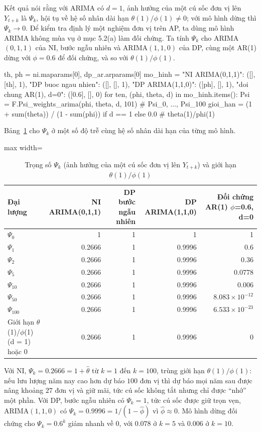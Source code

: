 Kết quả  nói rằng với ARIMA có $d=1$, ảnh hưởng của một cú sốc đơn vị lên $Y_{t+k}$ là $\Psi_k$, hội tụ về hệ số nhân dài hạn $\theta(1)/\phi(1)\ne0$; với mô hình dừng thì $\Psi_k\to0$.
 Để kiểm tra định lý một nghiệm đơn vị trên AP, ta dùng mô hình ARIMA không mùa vụ ở mục 5.2(a) làm đối chứng. Ta tính $\Psi_k$ cho ARIMA$(0,1,1)$ của NI, bước ngẫu nhiên và ARIMA$(1,1,0)$ của DP, cùng một AR(1) dừng với $\phi=0.6$ để đối chứng, và so với $\theta(1)/\phi(1)$.
\begin{codeblock}
th, ph = ni.maparams[0], dp_ar.arparams[0]
mo_hinh = {"NI ARIMA(0,1,1)": ([], [th], 1), "DP buoc ngau nhien": ([], [], 1),
           "DP ARIMA(1,1,0)": ([ph], [], 1), "doi chung AR(1), d=0": ([0.6], [], 0)}
for ten, (phi, theta, d) in mo_hinh.items():
    Psi = F.Psi_weights_arima(phi, theta, d, 101)             # Psi_0, ..., Psi_100
    gioi_han = (1 + sum(theta)) / (1 - sum(phi)) if d == 1 else 0.0   # theta(1)/phi(1)
\end{codeblock}
 Bảng~\ref{tab:tab_b12_06_psi_weights} cho $\Psi_k$ ở một số độ trễ cùng hệ số nhân dài hạn của từng mô hình.
\begin{table}[H]
\centering\footnotesize
\caption{Trọng số $\Psi_k$ (ảnh hưởng của một cú sốc đơn vị lên $Y_{t+k}$) và giới hạn $\theta(1)/\phi(1)$}\label{tab:tab_b12_06_psi_weights}
\begin{adjustbox}{max width=\linewidth}
\begin{tabular}{|l|r|r|r|r|}
\toprule
Đại lượng & NI ARIMA(0,1,1) & DP bước ngẫu nhiên & DP ARIMA(1,1,0) & Đối chứng AR(1) $\phi$=0.6, d=0 \\
\midrule
$\Psi_{0}$ & 1 & 1 & 1 & 1 \\
$\Psi_{1}$ & 0.2666 & 1 & 0.9996 & 0.6 \\
$\Psi_{2}$ & 0.2666 & 1 & 0.9996 & 0.36 \\
$\Psi_{5}$ & 0.2666 & 1 & 0.9996 & 0.0778 \\
$\Psi_{10}$ & 0.2666 & 1 & 0.9996 & 0.006 \\
$\Psi_{50}$ & 0.2666 & 1 & 0.9996 & $8.083\times10^{-12}$ \\
$\Psi_{100}$ & 0.2666 & 1 & 0.9996 & $6.533\times10^{-23}$ \\
Giới hạn $\theta$(1)/$\phi$(1) (d = 1) hoặc 0 & 0.2666 & 1 & 0.9996 & 0 \\
\bottomrule
\end{tabular}
\end{adjustbox}
\end{table}
 Với NI, $\Psi_k=0.2666=1+\hat\theta$ từ $k=1$ đến $k=100$, trùng giới hạn $\theta(1)/\phi(1)$: nếu lưu lượng năm nay cao hơn dự báo $100$ đơn vị thì dự báo mọi năm sau được nâng khoảng $27$ đơn vị và giữ mãi, tức cú sốc không tắt nhưng chỉ được ``nhớ'' một phần. Với DP, bước ngẫu nhiên có $\Psi_k=1$, tức cú sốc được giữ trọn vẹn, ARIMA$(1,1,0)$ có $\Psi_k=0.9996=1/(1-\hat\phi)$ vì $\hat\phi\approx0$. Mô hình dừng đối chứng cho $\Psi_k=0.6^k$ giảm nhanh về $0$, với $0.078$ ở $k=5$ và $0.006$ ở $k=10$.

